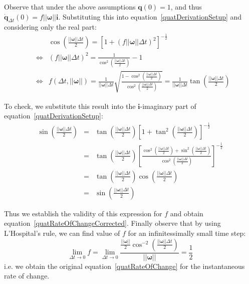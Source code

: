 Observe that under the above assumptions $\mathbf{q}(0) = 1$, and thus
$\dot{\mathbf{q}}_{\Delta t}(0) = f ||\mathbf{\omega}|| \mathbf{i}$. Substituting this
into equation~\ref{quatDerivationSetup} and considering only the real part:
\begin{eqnarray*}
&& \cos\left(\frac{||\mathbf{\omega}||\Delta t}{2}\right) =
    \left[1 + \left( f ||\mathbf{\omega}||\Delta t \right)^2 \right]^{-\frac{1}{2}} \\
&\Leftrightarrow&
    \left( f ||\mathbf{\omega}||\Delta t \right)^2 =
    \frac{1}{\cos^2\left(\frac{||\mathbf{\omega}||\Delta t}{2}\right)} - 1 \\
&\Leftrightarrow&
    f(\Delta t, ||\mathbf{\omega}||) =
    \frac{1}{||\mathbf{\omega}||\Delta t} \sqrt{\frac{
        1 - \cos^2\left(\frac{||\mathbf{\omega}||\Delta t}{2}\right)}{
        \cos^2\left(\frac{||\mathbf{\omega}||\Delta t}{2}\right)}} =
    \frac{1}{||\mathbf{\omega}||\Delta t}
        \tan\left(\frac{||\mathbf{\omega}||\Delta t}{2}\right)
\end{eqnarray*}

To check, we substitute this result into the $\mathbf{i}$-imaginary part of
equation~\ref{quatDerivationSetup}:
\begin{eqnarray*}
\sin\left(\frac{||\mathbf{\omega}||\Delta t}{2}\right) & = &
    \tan\left(\frac{||\mathbf{\omega}||\Delta t}{2}\right)
    \left[ 1 + \tan^2\left(\frac{||\mathbf{\omega}||\Delta t}{2}\right)
    \right]^{-\frac{1}{2}} \\
&=& \tan\left(\frac{||\mathbf{\omega}||\Delta t}{2}\right)
    \left[ \frac{\cos^2\left(\frac{||\mathbf{\omega}||\Delta t}{2}\right) +
    \sin^2\left(\frac{||\mathbf{\omega}||\Delta t}{2}\right) }{
    \cos^2\left(\frac{||\mathbf{\omega}||\Delta t}{2}\right) }
    \right]^{-\frac{1}{2}} \\
&=& \tan\left(\frac{||\mathbf{\omega}||\Delta t}{2}\right)
    \cos\left(\frac{||\mathbf{\omega}||\Delta t}{2}\right) \\
&=& \sin\left(\frac{||\mathbf{\omega}||\Delta t}{2}\right)
\end{eqnarray*}

Thus we establish the validity of this expression for $f$ and obtain
equation~\ref{quatRateOfChangeCorrected}. Finally observe that by using L'Hospital's rule,
we can find value of $f$ for an infinitessimally small time step:
$$
\lim_{\Delta t \to 0} f = \lim_{\Delta t \to 0} \frac{ \frac{||\mathbf{\omega}||}{2}
    \cos^{-2}\left(\frac{||\mathbf{\omega}||\Delta t}{2}\right) }{ ||\mathbf{\omega}|| } =
    \frac{1}{2}
$$
i.e. we obtain the original equation~\ref{quatRateOfChange} for the
instantaneous rate of change.

